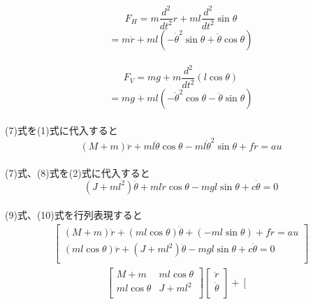 \documentclass{jarticle}
\begin{document}
\begin{enumerate}
\begin{enumerate}
\begin{enumerate}
					\[F_{H} = m\frac{d^{2}}{dt^{2}}r + ml\frac{d^{2}}{dt^{2}}\sin{\theta}\]
					\begin{equation}
						    = m\ddot{r}+ml(-\dot{\theta}^{2}\sin{\theta}+\ddot{\theta}\cos{\theta})
					\end{equation}
					\\
					\[F_{V} = mg + m\frac{d^{2}}{dt^{2}}(l\cos{\theta})\]
					\begin{equation}
						= mg + ml(-\dot{\theta}^{2}\cos{\theta}-\ddot{\theta}\sin{\theta})
					\end{equation}
					\\
					(7)式を(1)式に代入すると\\
					\begin{equation}
						(M+m)\ddot{r} + ml\ddot{\theta}\cos{\theta}-ml\dot{\theta}^{2}\sin{\theta}+f\dot{r}=au
					\end{equation}
					\\
					(7)式、(8)式を(2)式に代入すると\\
					\begin{equation}
						(J + ml^{2})\ddot{\theta} + ml\ddot{r}\cos{\theta} - mgl\sin{\theta} + c\dot{\theta} = 0
					\end{equation}
					\\
					(9)式、(10)式を行列表現すると\\
					\begin{eqnarray}
						\left[
						\begin{array}{ccc}
							(M + m)\ddot{r} + (ml\cos{\theta})\ddot{\theta} + (-ml\sin{\theta}) + f\dot{r} = au \\
							(ml\cos{\theta})\ddot{r} + (J + ml^{2})\ddot{\theta} -mgl\sin{\theta} + c\dot{\theta} = 0\\
						\end{array}
						\right]
					\end{eqnarray}
					\begin{eqnarray}
						\left[
						\begin{array}{ccc}
							M + m & ml\cos{\theta} \\
							ml\cos{\theta} & J + ml^{2}\\
						\end{array}
						\right]
						\left[
						\begin{array}{ccc}
							\ddot{r} \\
							\ddot{\theta}\\
						\end{array}
						\right] +
						\left[
						\begin{array}{ccc}

\end{array}
\end{eqnarray}
\end{enumerate}
\end{enumerate}
\end{enumerate}
\end{document}
